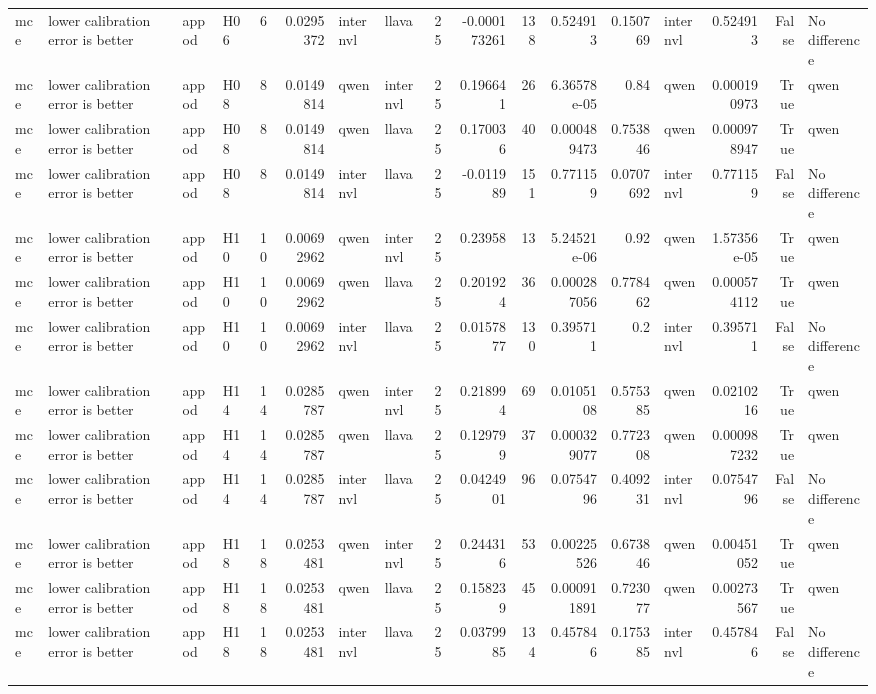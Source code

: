 \begin{longtable}{llllrrllrrrrrlrrl}
mce & lower calibration error is better & appod & H06 & 6 & 0.0295372 & internvl & llava & 25 & -0.000173261 & 138 & 0.524913 & 0.150769 & internvl & 0.524913 & False & No difference \\
mce & lower calibration error is better & appod & H08 & 8 & 0.0149814 & qwen & internvl & 25 & 0.196641 & 26 & 6.36578e-05 & 0.84 & qwen & 0.000190973 & True & qwen \\
mce & lower calibration error is better & appod & H08 & 8 & 0.0149814 & qwen & llava & 25 & 0.170036 & 40 & 0.000489473 & 0.753846 & qwen & 0.000978947 & True & qwen \\
mce & lower calibration error is better & appod & H08 & 8 & 0.0149814 & internvl & llava & 25 & -0.011989 & 151 & 0.771159 & 0.0707692 & internvl & 0.771159 & False & No difference \\
mce & lower calibration error is better & appod & H10 & 10 & 0.00692962 & qwen & internvl & 25 & 0.23958 & 13 & 5.24521e-06 & 0.92 & qwen & 1.57356e-05 & True & qwen \\
mce & lower calibration error is better & appod & H10 & 10 & 0.00692962 & qwen & llava & 25 & 0.201924 & 36 & 0.000287056 & 0.778462 & qwen & 0.000574112 & True & qwen \\
mce & lower calibration error is better & appod & H10 & 10 & 0.00692962 & internvl & llava & 25 & 0.0157877 & 130 & 0.395711 & 0.2 & internvl & 0.395711 & False & No difference \\
mce & lower calibration error is better & appod & H14 & 14 & 0.0285787 & qwen & internvl & 25 & 0.218994 & 69 & 0.0105108 & 0.575385 & qwen & 0.0210216 & True & qwen \\
mce & lower calibration error is better & appod & H14 & 14 & 0.0285787 & qwen & llava & 25 & 0.129799 & 37 & 0.000329077 & 0.772308 & qwen & 0.000987232 & True & qwen \\
mce & lower calibration error is better & appod & H14 & 14 & 0.0285787 & internvl & llava & 25 & 0.0424901 & 96 & 0.0754796 & 0.409231 & internvl & 0.0754796 & False & No difference \\
mce & lower calibration error is better & appod & H18 & 18 & 0.0253481 & qwen & internvl & 25 & 0.244316 & 53 & 0.00225526 & 0.673846 & qwen & 0.00451052 & True & qwen \\
mce & lower calibration error is better & appod & H18 & 18 & 0.0253481 & qwen & llava & 25 & 0.158239 & 45 & 0.000911891 & 0.723077 & qwen & 0.00273567 & True & qwen \\
mce & lower calibration error is better & appod & H18 & 18 & 0.0253481 & internvl & llava & 25 & 0.0379985 & 134 & 0.457846 & 0.175385 & internvl & 0.457846 & False & No difference \\

\end{longtable}

